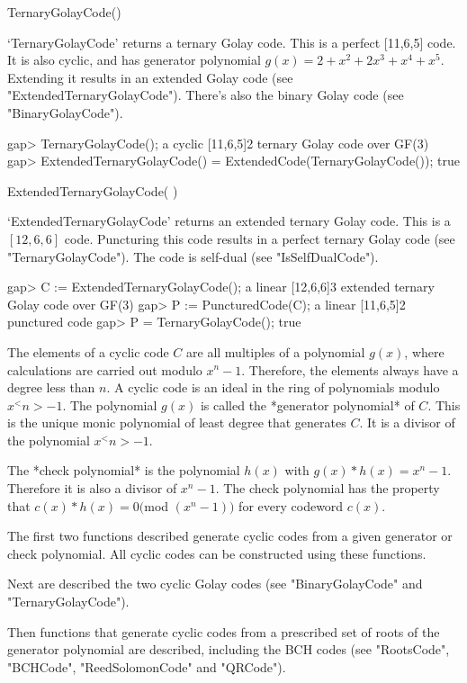 \>TernaryGolayCode()

`TernaryGolayCode'  returns  a ternary Golay  code.  This  is  a  perfect
[11,6,5] code.  It   is   also cyclic,   and  has  generator   polynomial
$g(x)=2+x^2+2x^3+x^4+x^5$. Extending it results in an extended Golay code
(see "ExtendedTernaryGolayCode"). There's also the binary Golay code (see
"BinaryGolayCode").

\beginexample
gap> TernaryGolayCode();
a cyclic [11,6,5]2 ternary Golay code over GF(3)
gap> ExtendedTernaryGolayCode() = ExtendedCode(TernaryGolayCode());
true 
\endexample

\>ExtendedTernaryGolayCode( )

`ExtendedTernaryGolayCode' returns an  extended ternary Golay  code. This
is a $[12,6,6]$ code. Puncturing  this code results  in a perfect ternary
Golay   code (see  "TernaryGolayCode").  The     code is self-dual   (see
"IsSelfDualCode").

\beginexample
gap> C := ExtendedTernaryGolayCode();
a linear [12,6,6]3 extended ternary Golay code over GF(3)
gap> P := PuncturedCode(C);
a linear [11,6,5]2 punctured code
gap> P = TernaryGolayCode();
true 
\endexample


The  elements of  a cyclic  code $C$ are   all multiples of  a polynomial
$g(x)$, where calculations are carried out modulo $x^n-1$. Therefore, the
elements always have a degree less than $n$. A cyclic code is an ideal in
the ring  of polynomials  modulo $x^<n>  - 1$. The  polynomial $g(x)$  is
called the  *generator polynomial*  of  $C$. This   is the  unique  monic
polynomial  of least degree that generates  $C$. It is  a  divisor of the
polynomial $x^<n>-1$.

The  *check polynomial*  is   the  polynomial  $h(x)$ with   $g(x)*h(x)=
x^n-1$. Therefore it is  also a divisor of  $x^n-1$. The check polynomial
has  the property that   $c(x)*h(x) =  0 ($mod  $  (x^n-1))$ for  every
codeword $c(x)$.

The first two functions described generate  cyclic  codes  from  a  given
generator or check polynomial. All cyclic codes can be constructed  using
these functions.

Next are described the two cyclic Golay codes (see "BinaryGolayCode"  and
"TernaryGolayCode").

Then functions that generate cyclic codes from a prescribed set of  roots
of the generator polynomial are described, including the BCH  codes  (see
"RootsCode", "BCHCode", "ReedSolomonCode" and "QRCode").


